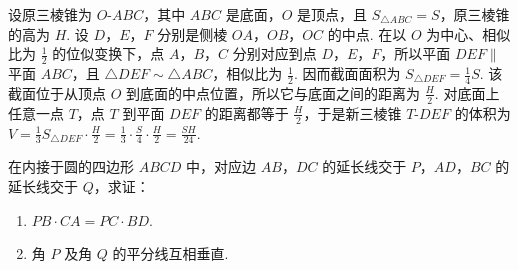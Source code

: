 \begin{solution}
设原三棱锥为 \(O\text{-}ABC\)，其中 \(ABC\) 是底面，\(O\) 是顶点，且 \(S_{\triangle ABC}=S\)，原三棱锥的高为 \(H\). 设 \(D\)，\(E\)，\(F\) 分别是侧棱 \(OA\)，\(OB\)，\(OC\) 的中点. 在以 \(O\) 为中心、相似比为 \(\frac{1}{2}\) 的位似变换下，点 \(A\)，\(B\)，\(C\) 分别对应到点 \(D\)，\(E\)，\(F\)，所以平面 \(DEF\parallel\) 平面 \(ABC\)，且 \(\triangle DEF\sim\triangle ABC\)，相似比为 \(\frac{1}{2}\). 因而截面面积为 \(S_{\triangle DEF}=\frac{1}{4}S\). 该截面位于从顶点 \(O\) 到底面的中点位置，所以它与底面之间的距离为 \(\frac{H}{2}\). 对底面上任意一点 \(T\)，点 \(T\) 到平面 \(DEF\) 的距离都等于 \(\frac{H}{2}\)，于是新三棱锥 \(T\text{-}DEF\) 的体积为 \(V=\frac{1}{3}S_{\triangle DEF}\cdot\frac{H}{2}=\frac{1}{3}\cdot\frac{S}{4}\cdot\frac{H}{2}=\frac{SH}{24}\).
\end{solution}

\begin{problem}
在内接于圆的四边形 \(ABCD\) 中，对应边 \(AB\)，\(DC\) 的延长线交于 \(P\)，\(AD\)，\(BC\) 的延长线交于 \(Q\)，求证：

\begin{enumerate}
\item \(PB\cdot CA=PC\cdot BD\).
\item 角 \(P\) 及角 \(Q\) 的平分线互相垂直.
\end{enumerate}
\end{problem}

